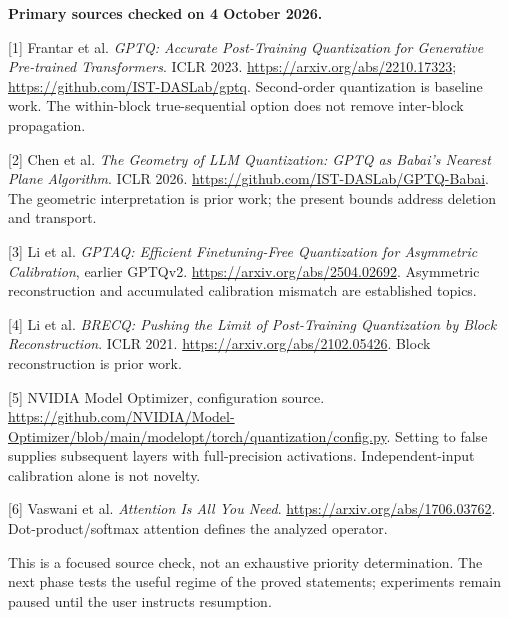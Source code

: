 \documentclass[11pt]{article}
\begin{document}
\small\raggedright\textbf{Primary sources checked on 4 October 2026.}

[1] Frantar et al. \emph{GPTQ: Accurate Post-Training Quantization for Generative Pre-trained Transformers}. ICLR 2023. \url{https://arxiv.org/abs/2210.17323}; \url{https://github.com/IST-DASLab/gptq}. Second-order quantization is baseline work. The within-block true-sequential option does not remove inter-block propagation.

[2] Chen et al. \emph{The Geometry of LLM Quantization: GPTQ as Babai's Nearest Plane Algorithm}. ICLR 2026. \url{https://github.com/IST-DASLab/GPTQ-Babai}. The geometric interpretation is prior work; the present bounds address deletion and transport.

[3] Li et al. \emph{GPTAQ: Efficient Finetuning-Free Quantization for Asymmetric Calibration}, earlier GPTQv2. \url{https://arxiv.org/abs/2504.02692}. Asymmetric reconstruction and accumulated calibration mismatch are established topics.

[4] Li et al. \emph{BRECQ: Pushing the Limit of Post-Training Quantization by Block Reconstruction}. ICLR 2021. \url{https://arxiv.org/abs/2102.05426}. Block reconstruction is prior work.

[5] NVIDIA Model Optimizer, configuration source. \url{https://github.com/NVIDIA/Model-Optimizer/blob/main/modelopt/torch/quantization/config.py}. Setting  to false supplies subsequent layers with full-precision activations. Independent-input calibration alone is not novelty.

[6] Vaswani et al. \emph{Attention Is All You Need}. \url{https://arxiv.org/abs/1706.03762}. Dot-product/softmax attention defines the analyzed operator.

This is a focused source check, not an exhaustive priority determination. The next phase tests the useful regime of the proved statements; experiments remain paused until the user instructs resumption.
\normalsize\normalfont



\end{document}
